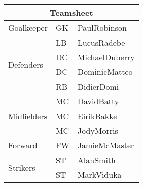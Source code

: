 \begin{tabular}{|l|l|l|}
\hline
\multicolumn{3}{|c|}{Teamsheet}\\
\hline
Goalkeeper&GK&PaulRobinson\\\hline
\multirow{4}{*}{Defenders}&LB&LucusRadebe\\
&DC&MichaelDuberry\\
&DC&DominicMatteo\\
&RB&DidierDomi\\\hline
\multirow{3}{*}{Midfielders}&MC&DavidBatty\\
&MC&EirikBakke\\
&MC&JodyMorris\\\hline
Forward&FW&JamieMcMaster\\\hline
\multirow{2}{*}{Strikers}&ST&AlanSmith\\
&ST&MarkViduka\\
\hline
\end{tabular}